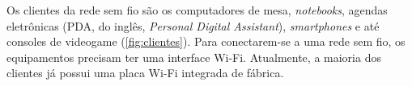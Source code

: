 \begin{figure}[H]
	\centering
\end{figure}

Os clientes da rede sem fio são os computadores de mesa, \textit{notebooks}, agendas eletrônicas (PDA, do inglês, \textit{Personal Digital Assistant}), \textit{smartphones} e até consoles de videogame (\autoref{fig:clientes}). Para conectarem-se a uma rede sem fio, os equipamentos precisam ter uma interface Wi-Fi. Atualmente, a maioria dos clientes já possui uma placa Wi-Fi integrada de fábrica.

\begin{figure}[H]
	\centering
\end{figure}

